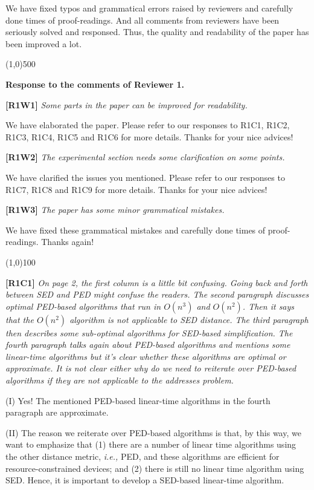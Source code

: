 \documentclass{letter}
\newcommand{\ie}{\emph{i.e.,}\xspace}
\begin{document}
We have fixed typos and grammatical errors raised by reviewers and carefully done times of proof-readings. And all comments from reviewers have been seriously solved and responsed. Thus, the quality and readability of the paper has been improved a lot.

\line(1,0){500}

\textbf{Response to the comments of Reviewer 1.}

\textbf{[R1W1]} \emph{Some parts in the paper can be improved for readability.}

We have elaborated the paper. Please refer to our responses to R1C1, R1C2, R1C3, R1C4, R1C5 and R1C6 for more details. Thanks for your nice advices!

\textbf{[R1W2]} \emph{The experimental section needs some clarification on some points.}

We have clarified the issues you mentioned. Please refer to our responses to R1C7, R1C8 and R1C9 for more details. Thanks for your nice advices!

\textbf{[R1W3]} \emph{The paper has some minor grammatical mistakes.}

We have fixed these grammatical mistakes and carefully done times of proof-readings. Thanks again!

\line(1,0){100}

\textbf{[R1C1]} \emph{On page 2, the first column is a little bit confusing. Going back and forth between SED and PED might confuse the readers. The second paragraph discusses optimal PED-based algorithms that run in $O(n^3)$ and $O(n^2)$. Then it says that the $O(n^2)$ algorithm is not applicable to SED distance. The third paragraph then describes some sub-optimal algorithms for SED-based simplification. {The fourth paragraph talks again about PED-based algorithms and mentions some linear-time algorithms but it's clear whether these algorithms are optimal or approximate. It is not clear either why do we need to reiterate over PED-based algorithms if they are not applicable to the addresses problem.}}
 
(I) Yes! The mentioned PED-based linear-time algorithms in the fourth paragraph are approximate. 

(II) The reason we reiterate over PED-based algorithms is that, by this way, we want to emphasize that (1) there are a number of linear time algorithms using the other distance metric, \ie PED, and these algorithms are efficient for resource-constrained devices; and (2) there is still no linear time algorithm using SED. Hence, it is important to develop a SED-based linear-time algorithm. 
\end{document}

